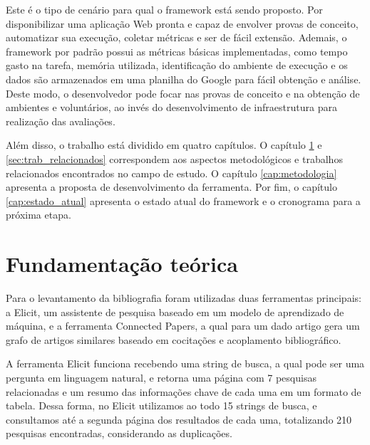 \documentclass[12pt]{tcc}
\begin{document}
Este é o tipo de cenário para qual o framework está sendo proposto.
Por disponibilizar uma aplicação Web pronta e capaz de envolver provas de conceito, automatizar sua execução, coletar métricas e ser de fácil extensão.
Ademais, o framework por padrão possui as métricas básicas implementadas, como tempo gasto na tarefa, memória utilizada, identificação do ambiente de execução e os dados são armazenados em uma planilha do Google para fácil obtenção e análise.
Deste modo, o desenvolvedor pode focar nas provas de conceito e na obtenção de ambientes e voluntários, ao invés do desenvolvimento de infraestrutura para realização das avaliações.

Além disso, o trabalho está dividido em quatro capítulos.
O capítulo \ref{cap:fund_teorica} e \ref{sec:trab_relacionados} correspondem aos aspectos metodológicos e trabalhos relacionados encontrados no campo de estudo.
O capítulo \ref{cap:metodologia} apresenta a proposta de desenvolvimento da ferramenta.
Por fim, o capítulo \ref{cap:estado_atual} apresenta o estado atual do framework e o cronograma para a próxima etapa.


\chapter{Fundamentação teórica}
\label{cap:fund_teorica}

Para o levantamento da bibliografia foram utilizadas duas ferramentas principais: a Elicit, um assistente de pesquisa baseado em um modelo  de aprendizado de máquina, e a ferramenta Connected Papers, a qual para um dado artigo gera um grafo de artigos similares baseado em cocitações e acoplamento bibliográfico.

A ferramenta Elicit funciona recebendo uma string de busca, a qual pode ser uma pergunta em linguagem natural, e retorna uma página com 7 pesquisas relacionadas e um resumo das informações chave de cada uma em um formato de tabela.
Dessa forma, no Elicit utilizamos ao todo 15 strings de busca, e consultamos até a segunda página dos resultados de cada uma, totalizando 210 pesquisas encontradas, considerando as duplicações.
\end{document}
